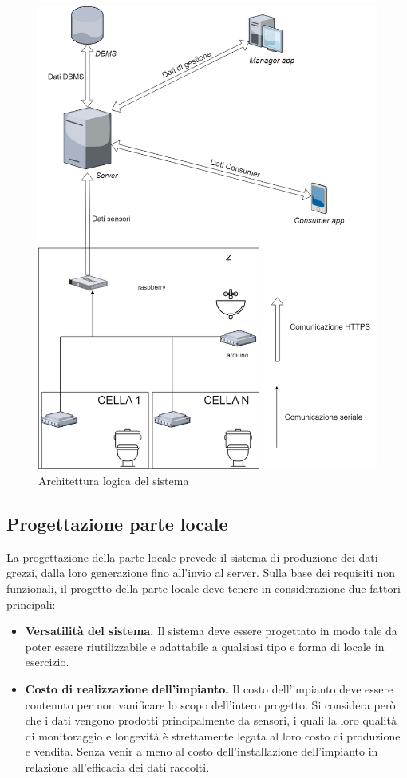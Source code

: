 \documentclass[12pt]{article}
\begin{document}
\begin{figure}[h!]
\centering
  \includegraphics[scale=0.33]{img/architettura_logica-report.png}
  \caption{Architettura logica del sistema}
\end{figure}
\subsection{Progettazione parte locale}
La progettazione della parte locale prevede il sistema di produzione dei dati grezzi, dalla loro generazione fino all'invio al server.
Sulla base dei requisiti non funzionali, il progetto della parte locale deve tenere in considerazione due fattori principali:
\begin{itemize}
	\item \textbf{Versatilità del sistema.}
	Il sistema deve essere progettato in modo tale da poter essere riutilizzabile e adattabile a qualsiasi tipo e forma di locale in esercizio. 
	\item \textbf{Costo di realizzazione dell'impianto.}
	Il costo dell'impianto deve essere contenuto per non vanificare lo scopo dell'intero progetto. Si considera però che i dati vengono prodotti principalmente da sensori, i quali la loro qualità di monitoraggio e longevità è strettamente legata al loro costo di produzione e vendita. Senza venir a meno al costo dell'installazione dell'impianto in relazione all'efficacia dei dati raccolti.
\end{itemize}  
\end{document}
